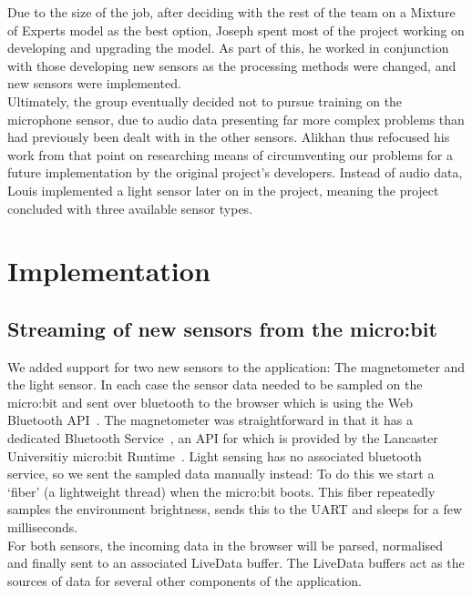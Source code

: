 \documentclass{article}
\begin{document}
Due to the size of the job, after deciding with the rest of the team on a Mixture of Experts model as the best option, Joseph spent most of the project working on developing and upgrading the model. As part of this, he worked in conjunction with those developing new sensors as the processing methods were changed, and new sensors were implemented. \\

Ultimately, the group eventually decided not to pursue training on the microphone sensor, due to audio data presenting far more complex problems than had previously been dealt with in the other sensors. Alikhan thus refocused his work from that point on researching means of circumventing our problems for a future implementation by the original project's developers. Instead of audio data, Louis implemented a light sensor later on in the project, meaning the project concluded with three available sensor types.

\section{Implementation}%
\label{sec:implementation}

\subsection{Streaming of new sensors from the micro:bit}%
\label{subsec:streaming}
We added support for two new sensors to the application: The magnetometer and the light sensor. In each case the sensor data needed to be sampled on the micro:bit and sent over bluetooth to the browser which is using the Web Bluetooth API~\cite{bluetoothapi}. The magnetometer was straightforward in that it has a dedicated Bluetooth Service~\cite{microbitservices}, an API for which is provided by the Lancaster Universitiy micro:bit Runtime~\cite{magnetometerservice}. Light sensing has no associated bluetooth service, so we sent the sampled data manually instead: To do this we start a `fiber' (a lightweight thread) when the micro:bit boots. This fiber repeatedly samples the environment brightness, sends this to the UART and sleeps for a few milliseconds. \\

For both sensors, the incoming data in the browser will be parsed, normalised and finally sent to an associated LiveData buffer. The LiveData buffers act as the sources of data for several other components of the application. \\
\end{document}
